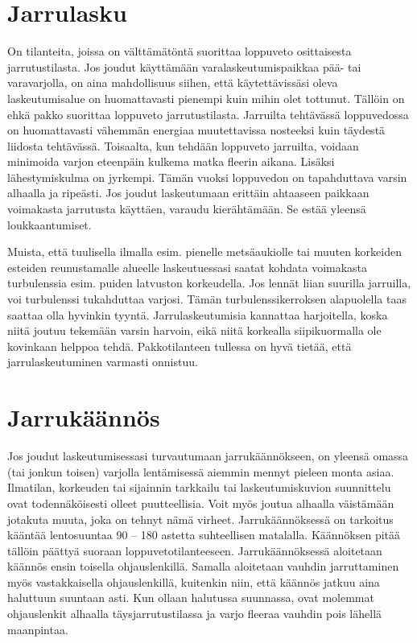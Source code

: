 \section{ Jarrulasku }
\label{laskeutumistekniikat-jarrulasku}


On tilanteita, joissa on välttämätöntä suorittaa loppuveto osittaisesta jarrutustilasta. Jos joudut käyttämään varalaskeutumispaikkaa pää- tai varavarjolla, on aina mahdollisuus siihen, että käytettävissäsi oleva laskeutumisalue on huomattavasti pienempi kuin mihin olet tottunut. Tällöin on ehkä pakko suorittaa loppuveto jarrutustilasta. Jarruilta tehtävässä loppuvedossa on huomattavasti vähemmän energiaa muutettavissa nosteeksi kuin täydestä liidosta tehtävässä. Toisaalta, kun tehdään loppuveto jarruilta, voidaan minimoida varjon eteenpäin kulkema matka fleerin aikana. Lisäksi lähestymiskulma on jyrkempi. Tämän vuoksi loppuvedon on tapahduttava varsin alhaalla ja ripeästi. Jos joudut laskeutumaan erittäin ahtaaseen paikkaan voimakasta jarrutusta käyttäen, varaudu kierähtämään. Se estää yleensä loukkaantumiset. 


Muista, että tuulisella ilmalla esim. pienelle metsäaukiolle tai muuten korkeiden esteiden reunustamalle alueelle laskeutuessasi saatat kohdata voimakasta turbulenssia esim. puiden latvuston korkeudella. Jos lennät liian suurilla jarruilla, voi turbulenssi tukahduttaa varjosi. Tämän turbulenssikerroksen alapuolella taas saattaa olla hyvinkin tyyntä. Jarrulaskeutumisia kannattaa harjoitella, koska niitä joutuu tekemään varsin harvoin, eikä niitä korkealla siipikuormalla ole kovinkaan helppoa tehdä. Pakkotilanteen tullessa on hyvä tietää, että jarrulaskeutuminen varmasti onnistuu. 

\section{ Jarrukäännös }
\label{laskeutumistekniikat-jarrukaannos}


Jos joudut laskeutumisessasi turvautumaan jarrukäännökseen, on yleensä omassa (tai jonkun toisen) varjolla lentämisessä aiemmin mennyt pieleen monta asiaa. Ilmatilan, korkeuden tai sijainnin tarkkailu tai laskeutumiskuvion suunnittelu ovat todennäköisesti olleet puutteellisia. Voit myös joutua alhaalla väistämään jotakuta muuta, joka on tehnyt nämä virheet. Jarrukäännöksessä on tarkoitus kääntää lentosuuntaa 90 – 180 astetta suhteellisen matalalla. Käännöksen pitää tällöin päättyä suoraan loppuvetotilanteeseen. Jarrukäännöksessä aloitetaan käännös ensin toisella ohjauslenkillä. Samalla aloitetaan vauhdin jarruttaminen myös vastakkaisella ohjauslenkillä, kuitenkin niin, että käännös jatkuu aina haluttuun suuntaan asti. Kun ollaan halutussa suunnassa, ovat molemmat ohjauslenkit alhaalla täysjarrutustilassa ja varjo fleeraa vauhdin pois lähellä maanpintaa.  


